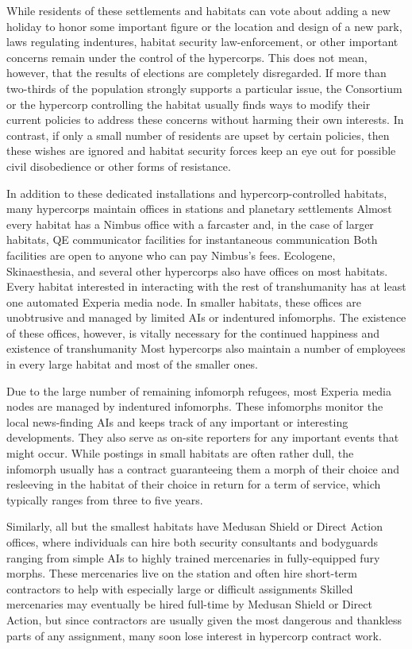 While residents of these settlements and habitats 
can vote about adding a new holiday to honor some 
important figure or the location and design of a 
new park, laws regulating indentures, habitat security
law-enforcement, or other important concerns
remain under the control of the hypercorps. This 
does not mean, however, that the results of elections 
are completely disregarded. If more than two-thirds 
of the population strongly supports a particular 
issue, the Consortium or the hypercorp controlling 
the habitat usually finds ways to modify their current 
policies to address these concerns without harming
their own interests. In contrast, if only a small
number of residents are upset by certain policies, 
then these wishes are ignored and habitat security 
forces keep an eye out for possible civil disobedience 
or other forms of resistance.

In addition to these dedicated installations and 
hypercorp-controlled habitats, many hypercorps 
maintain offices in stations and planetary settlements
Almost every habitat has a Nimbus office
with a farcaster and, in the case of larger habitats, 
QE communicator facilities for instantaneous communication
Both facilities are open to anyone who
can pay Nimbus's fees. Ecologene, Skinaesthesia, 
and several other hypercorps also have offices on 
most habitats. Every habitat interested in interacting
with the rest of transhumanity has at least one
automated Experia media node. In smaller habitats, 
these offices are unobtrusive and managed by limited
AIs or indentured infomorphs. The existence
of these offices, however, is vitally necessary for the 
continued happiness and existence of transhumanity
Most hypercorps also maintain a number of
employees in every large habitat and most of the 
smaller ones.

Due to the large number of remaining infomorph 
refugees, most Experia media nodes are managed by 
indentured infomorphs. These infomorphs monitor 
the local news-finding AIs and keeps track of any 
important or interesting developments. They also 
serve as on-site reporters for any important events 
that might occur. While postings in small habitats 
are often rather dull, the infomorph usually has a 
contract guaranteeing them a morph of their choice 
and resleeving in the habitat of their choice in return 
for a term of service, which typically ranges from 
three to five years.

Similarly, all but the smallest habitats have Medusan
Shield or Direct Action offices, where individuals
can hire both security consultants and bodyguards 
ranging from simple AIs to highly trained mercenaries
in fully-equipped fury morphs. These mercenaries
live on the station and often hire short-term contractors
to help with especially large or difficult assignments
Skilled mercenaries may eventually be hired
full-time by Medusan Shield or Direct Action, but 
since contractors are usually given the most dangerous
and thankless parts of any assignment, many
soon lose interest in hypercorp contract work.

